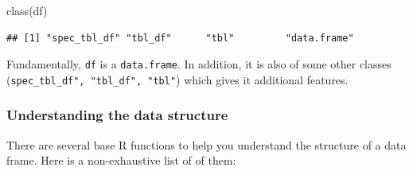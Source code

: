 \documentclass[
]{book}
\newenvironment{Shaded}{\begin{snugshade}}{\end{snugshade}}
\newcommand{\FunctionTok}[1]{\textcolor[rgb]{0.00,0.00,0.00}{#1}}
\newcommand{\NormalTok}[1]{#1}
\begin{document}
\begin{Shaded}
\begin{Highlighting}[]
\FunctionTok{class}\NormalTok{(df)}
\end{Highlighting}
\end{Shaded}

\begin{verbatim}
## [1] "spec_tbl_df" "tbl_df"      "tbl"         "data.frame"
\end{verbatim}

Fundamentally, \texttt{df} is a \texttt{data.frame}. In addition, it is also of some other classes (\texttt{spec\_tbl\_df",\ "tbl\_df",\ "tbl"}) which gives it additional features.

\hypertarget{understanding-the-data-structure}{%
\subsubsection{Understanding the data structure}\label{understanding-the-data-structure}}

There are several base R functions to help you understand the structure of a data frame. Here is a non-exhaustive list of of them:
\end{document}
